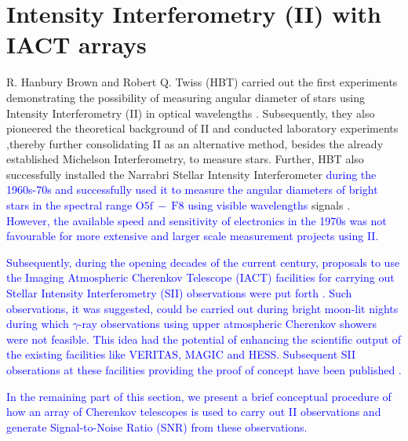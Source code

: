 \section{Intensity Interferometry (II) with IACT arrays}
R. Hanbury Brown and Robert Q. Twiss (HBT) carried out the first experiments demonstrating the possibility of measuring angular diameter of stars using Intensity Interferometry (II) in optical wavelengths \citep{HBT56}. Subsequently, they also pioneered the theoretical background of II and conducted laboratory experiments \citep{brown1957interferometry,brown1958interferometry},thereby further consolidating II as an alternative method, besides the already established Michelson Interferometry, to measure stars. Further, HBT also successfully installed the Narrabri Stellar Intensity Interferometer \textcolor{blue}{during the 1960s-70s and successfully used it to measure the angular diameters of bright stars in the spectral range $\mathrm{O5f}\ -\ \mathrm{F8}$ using visible wavelengths} signals \citep{brown1974intensity}. \\\textcolor{blue}
{However, the available speed and sensitivity of electronics in the 1970s was not favourable for more extensive and larger scale measurement projects using II.}

\textcolor{blue}{Subsequently, during the opening decades of the current century, proposals to use the Imaging Atmospheric Cherenkov Telescope (IACT) facilities for carrying out Stellar Intensity Interferometry (SII) observations were put forth \citep{LeBohec2006, Nunez2010stellar, Nunez2012High, Dravins2013}. Such observations, it was suggested, could be carried out during bright moon-lit nights during which $\gamma$-ray observations using upper atmospheric Cherenkov showers were not feasible. This idea had the potential of enhancing the scientific output of the existing facilities like VERITAS, MAGIC and HESS. Subsequent SII obserations at these facilities providing the proof of concept have been published \citep{abeysekara2020demonstration, Abe2024MAGIC, Zmija2023}. }

\textcolor{blue}{In the remaining part of this section, we present a brief conceptual procedure of how an array of Cherenkov telescopes is used to carry out II observations and generate Signal-to-Noise Ratio (SNR) from these observations.}

